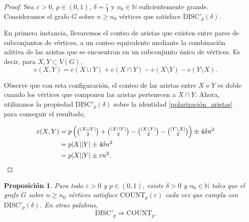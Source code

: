 \documentclass{article}[14pts]
\newtheorem{prop}{Proposición}
\newcommand{\discp}{\mathrm{DISC'}}
\newcommand{\Count}{\mathrm{COUNT}}
\let\varepsilon=\varepsilon
\begin{document}
\begin{proof}
    Sea $\varepsilon > 0$, $p\in (0,1)$, $\delta = \frac{\varepsilon}{4}$ y $n_0\in\mathbb{N}$ suficientemente grande. Consideramos el grafo $G$ sobre $n\geq n_0$ vértices que satisface $\discp_p(\delta)$.

    En primera instancia, llevaremos el conteo de aristas que existen entre pares de subconjuntos de vértices, a un conteo equivalente mediante la combinación aditiva de las aristas que se encuentran en un subconjunto único de vértices. Es decir, para $X,Y\subset V(G)$,
    \begin{equation} \label{polarización_aristas}
        e(X,Y) = e(X\cup Y) + e(X\cap Y) - e(X\setminus Y) - e(Y\setminus X).    
    \end{equation}

    Observe que con esta configuración, el conteo de las aristas entre $X$ e $Y$ es doble cuando los vértices que componen las aristas pertenecen a $X\cap Y$. Ahora, utilizamos la propiedad $\discp_p(\delta)$ sobre la identidad \eqref{polarización_aristas} para conseguir el resultado,
    
    \begin{align*}
        e(X,Y) &= p\left( \tbinom{|X\cup Y|}{2} + \tbinom{|X\cap Y|}{2} - \tbinom{|X\setminus Y|}{2} - \tbinom{|Y\setminus X|}{2} \right) \pm 4\delta n^{2} \\
        &= p|X||Y| \pm 4\delta n^{2} \\
        &= p|X||Y| \pm \varepsilon n^{2}.
    \end{align*}
\end{proof}\medskip

\begin{prop} \label{discp => count}
    Para todo $\varepsilon > 0$ y $p\in(0,1)$, existe $\delta > 0$ y $n_0\in\mathbb{N}$ tales que el grafo $G$ sobre $n\geq n_0$ vértices satisface $\Count_p (\varepsilon)$ cada vez que cumpla con $\discp_p (\delta)$. En otras palabras,
    \[
        \discp_p \Rightarrow \Count_p.
    \]
\end{prop}
\end{document}

